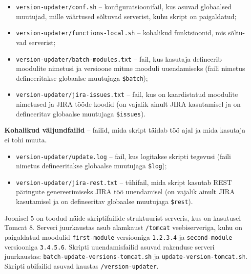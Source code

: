 \documentclass[12pt]{article}
\newcommand{\code}[1]{\texttt{#1}}
\begin{document}
  \begin{itemize}
    \item \code{version-updater/conf.sh} \--- konfiguratsioonifail, kus asuvad globaalsed muutujad, mille väärtused sõltuvad serverist, kuhu skript on paigaldatud;
    \item \code{version-updater/functions-local.sh} \--- kohalikud funktsioonid, mis sõltu\--vad serverist;
    \item \code{version-updater/batch-modules.txt} \--- fail, kus kasutaja defineerib moodulite nimetusi ja versioone mitme mooduli uuendamiseks (faili nimetus defineeritakse globaalse muutujaga \code{\$batch});
    \item \code{version-updater/jira-issues.txt} \--- fail, kus on kaardistatud moodulite nimetused ja JIRA tööde koodid (on vajalik ainult JIRA kasutamisel ja on defineeritav globaalse muutujaga \code{\$issues}).
  \end{itemize}
  
  \textbf{Kohalikud väljundfailid} \--- failid, mida skript täidab töö ajal ja mida kasutaja ei tohi muuta.
  
  \begin{itemize}
    \item \code{version-updater/update.log} \--- fail, kus logitakse skripti tegevusi (faili nimetus defineeritakse globaalse muutujaga \code{\$log});
    \item \code{version-updater/jira-rest.txt} \--- tühifail, mida skript kasutab REST \cite{rest} päringute genereerimiseks JIRA töö uuendamisel \cite{jira} (on vajalik ainult JIRA kasutamisel ja on defineeritav globaalse muutujaga \code{\$rest}).
  \end{itemize}
  
  Joonisel 5 on toodud näide skriptifailide struktuurist serveris, kus on kasutusel Tomcat 8. Serveri juurkaustas asub alamkaust \code{/tomcat} veebiserveriga, kuhu on paigaldatud moodulid \code{first-module} versiooniga \code{1.2.3.4} ja \code{second-module} versiooniga \code{3.4.5.6}. Skripti uuendamisfailid asuvad rakenduse serveri juurkaustas: \code{batch-update-versions-tomcat.sh} ja \code{update-version-tomcat.sh}. Skripti abifailid asuvad kaustas \code{/version-updater}.
  
\end{document}
